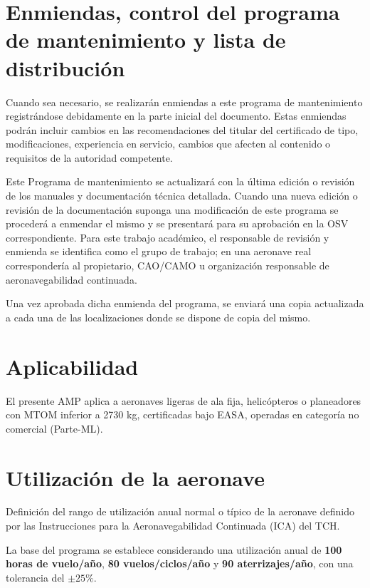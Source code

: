 \documentclass[12pt]{article}
\begin{document}
\section*{Enmiendas, control del programa de mantenimiento y lista de distribución}
\label{sec:enmiendas}

Cuando sea necesario, se realizarán enmiendas a este programa de mantenimiento registrándose debidamente en la parte inicial del documento. Estas enmiendas podrán incluir cambios en las recomendaciones del titular del certificado de tipo, modificaciones, experiencia en servicio, cambios que afecten al contenido o requisitos de la autoridad competente.

Este Programa de mantenimiento se actualizará con la última edición o revisión de los manuales y documentación técnica detallada. Cuando una nueva edición o revisión de la documentación suponga una modificación de este programa se procederá a enmendar el mismo y se presentará para su aprobación en la OSV correspondiente. Para este trabajo académico, el responsable de revisión y enmienda se identifica como el grupo de trabajo; en una aeronave real correspondería al propietario, CAO/CAMO u organización responsable de aeronavegabilidad continuada.

Una vez aprobada dicha enmienda del programa, se enviará una copia actualizada a cada una de las localizaciones donde se dispone de copia del mismo.

\section{Aplicabilidad}
\label{sec:aplicabilidad}

El presente AMP aplica a aeronaves ligeras de ala fija, helicópteros o planeadores con MTOM inferior a 2730 kg, certificadas bajo EASA, operadas en categoría no comercial (Parte-ML).

\section{Utilización de la aeronave}
\label{sec:utilizacion}

Definición del rango de utilización anual normal o típico de la aeronave definido por las Instrucciones para la Aeronavegabilidad Continuada (ICA) del TCH.

La base del programa se establece considerando una utilización anual de \textbf{100 horas de vuelo/año}, \textbf{80 vuelos/ciclos/año} y \textbf{90 aterrizajes/año}, con una tolerancia del \(\pm25\%\).
\end{document}
